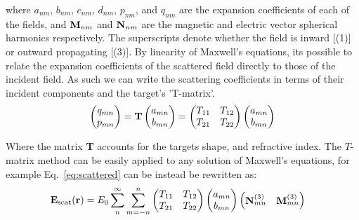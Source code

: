 where $a_{nm}$, $b_{nm}$, $c_{nm}$, $d_{nm}$, $p_{nm}$, and $q_{nm}$
are the expansion coefficients of each of the fields, and ${\bf M}_
{nm}$ and ${\bf N}_{nm}$ are the magnetic and electric vector 
spherical harmonics respectively. The superscripts denote whether 
the field is inward [(1)] or outward propagating [(3)]. By linearity 
of Maxwell's equations, its possible to relate the expansion 
coefficients of the scattered field directly to those of the incident 
field. As such we can write the scattering coefficients in terms of 
their incident components and the target's 'T-matrix'.
\begin{align}
	\label{eq:t_matrix}
	\begin{pmatrix}
		q_{mn} \\
		p_{mn} 
	\end{pmatrix}
	= \bold{T} 
	\begin{pmatrix}
		a_{mn} \\
		b_{mn}
	\end{pmatrix}
	= \begin{pmatrix}
		T_{11} & T_{12} \\
		T_{21} & T_{22}
	\end{pmatrix}
	\begin{pmatrix}
		a_{mn} \\
		b_{mn}
	\end{pmatrix}
\end{align}

Where the matrix \textbf{T} accounts for the targets shape, and 
refractive index. The $T$-matrix method can be easily 
applied to any solution of Maxwell's equations, for example Eq.~\eqref{eq:scattered} can be instead be rewritten as:
\begin{align}
{\bf E}_{\rm scat}({\bf r})
&=
E_0 \sum_{n}^\infty \sum_{m=-n}^n 
\begin{pmatrix}
	T_{11} & T_{12} \\
	T_{21} & T_{22}
\end{pmatrix}
\begin{pmatrix}
	a_{mn} \\
	b_{mn}
\end{pmatrix}
\begin{pmatrix}
	{\bf N}_{mn}^{(3)} & {\bf M}_{mn}^{(3)}
\end{pmatrix}
\end{align}
  
